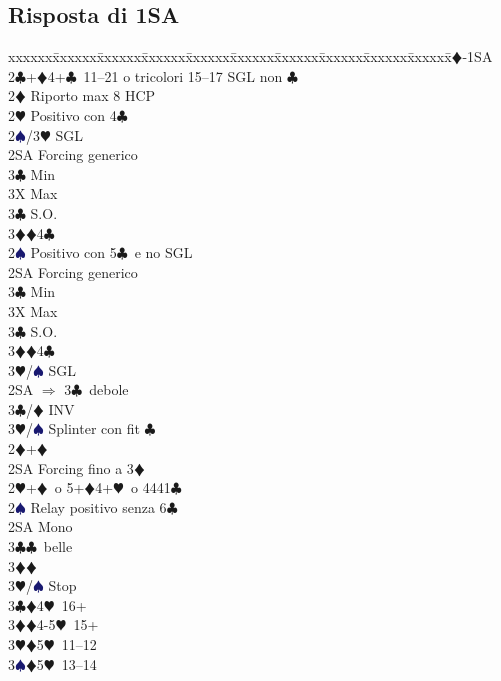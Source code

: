 \documentclass[a4paper,italian]{article}
\newcommand{\BC}{\textcolor{OliveGreen}{$\clubsuit$}}
\newcommand{\BD}{\textcolor{RedOrange}{$\vardiamondsuit$}}
\newcommand{\BH}{\textcolor{Red2}{$\varheartsuit${}}}
\newcommand{\BS}{\textcolor{MidnightBlue}{$\spadesuit${}}}
\newenvironment{bidtable}
{\begin{tabbing}

    xxxxxx\=xxxxxx\=xxxxxx\=xxxxxx\=xxxxxx\=xxxxxx\=xxxxxx\=xxxxxx\=xxxxxx\=xxxxxx\=\kill}
{\end{tabbing} }%
\begin{document}
\begin{multicols}{2}
    \subsection{Risposta di 1SA}

    \begin{bidtable}
        1\BD-1SA\+\\
        2\BC {}+\BD 4+\BC\ 11--21 o tricolori 15--17 SGL non \BC \+\\
        2\BD \> Riporto max 8 HCP\\
        2\BH \> Positivo con 4\BC \+\\
        2\BS/3\BH \> SGL\\
        2SA \> Forcing generico\+\\
        3\BC \> Min\\
        3X \> Max\-\\
        3\BC \> S.O.\\
        3\BD {}\BD 4\BC \-\\
        2\BS \> Positivo con 5\BC\ e no SGL\+\\
        2SA \> Forcing generico\+\\
        3\BC \> Min\\
        3X \> Max\-\\
        3\BC \> S.O.\\
        3\BD {}\BD 4\BC \\
        3\BH/\BS \> SGL\-\\
        2SA \> $\Rightarrow$ 3\BC\ debole\\
        3\BC/\BD \> INV\\
        3\BH/\BS \> Splinter con fit \BC \-\\
        2\BD {}+\BD \+\\
        2SA \> Forcing fino a 3\BD \-\\
        2\BH {}+\BD\ o 5+\BD 4+\BH\ o 4441\BC \+\\
        2\BS \> Relay positivo senza 6\BC \+\\
        2SA \> Mono\+\\
        3\BC {}\BC\ belle\\
        3\BD {}\BD \\
        3\BH/\BS \> Stop\-\\
        3\BC {}\BD 4\BH\ 16+\\
        3\BD {}\BD 4-5\BH\ 15+\\
        3\BH {}\BD 5\BH\ 11--12\\
        3\BS {}\BD 5\BH\ 13--14\\

\end{bidtable}
\end{multicols}
\end{document}
